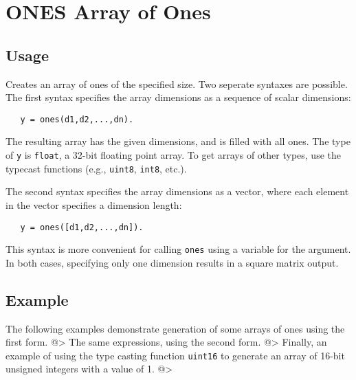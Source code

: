 \section{ONES Array of Ones}

\subsection{Usage}

Creates an array of ones of the specified size.  Two seperate 
syntaxes are possible.  The first syntax specifies the array 
dimensions as a sequence of scalar dimensions:
\begin{verbatim}
   y = ones(d1,d2,...,dn).
\end{verbatim}
The resulting array has the given dimensions, and is filled with
all ones.  The type of \verb|y| is \verb|float|, a 32-bit floating
point array.  To get arrays of other types, use the typecast 
functions (e.g., \verb|uint8|, \verb|int8|, etc.).
    
The second syntax specifies the array dimensions as a vector,
where each element in the vector specifies a dimension length:
\begin{verbatim}
   y = ones([d1,d2,...,dn]).
\end{verbatim}
This syntax is more convenient for calling \verb|ones| using a 
variable for the argument.  In both cases, specifying only one
dimension results in a square matrix output.
\subsection{Example}

The following examples demonstrate generation of some arrays of ones
using the first form.
@>
The same expressions, using the second form.
@>
Finally, an example of using the type casting function \verb|uint16| to generate an array of 16-bit unsigned integers with a value of 1.
@>
